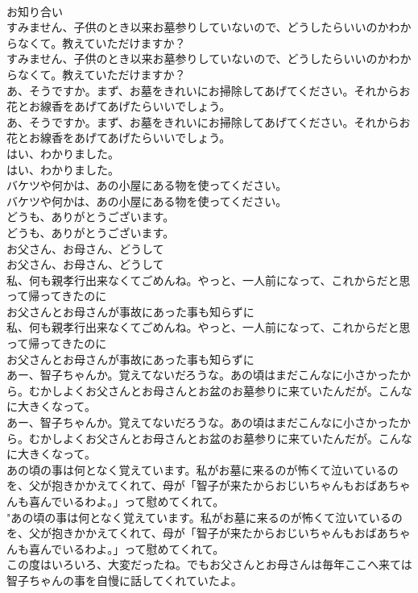 \documentclass[8pt]{extreport}
\begin{document}
\begin{CJK}{UTF8}{min}
\\	お知り合い
\\	すみません、子供のとき以来お墓参りしていないので、どうしたらいいのかわからなくて。教えていただけますか？	
\\	すみません、子供のとき以来お墓参りしていないので、どうしたらいいのかわからなくて。教えていただけますか？ 
\\	あ、そうですか。まず、お墓をきれいにお掃除してあげてください。それからお花とお線香をあげてあげたらいいでしょう。	
\\	あ、そうですか。まず、お墓をきれいにお掃除してあげてください。それからお花とお線香をあげてあげたらいいでしょう。 
\\	はい、わかりました。	
\\	はい、わかりました。 
\\	バケツや何かは、あの小屋にある物を使ってください。	
\\	バケツや何かは、あの小屋にある物を使ってください。 
\\	どうも、ありがとうございます。	
\\	どうも、ありがとうございます。 
\\	お父さん、お母さん、どうして
\\	お父さん、お母さん、どうして
\\	私、何も親孝行出来なくてごめんね。やっと、一人前になって、これからだと思って帰ってきたのに
\\	お父さんとお母さんが事故にあった事も知らずに
\\	私、何も親孝行出来なくてごめんね。やっと、一人前になって、これからだと思って帰ってきたのに
\\	お父さんとお母さんが事故にあった事も知らずに
\\	あー、智子ちゃんか。覚えてないだろうな。あの頃はまだこんなに小さかったから。むかしよくお父さんとお母さんとお盆のお墓参りに来ていたんだが。こんなに大きくなって。	
\\	あー、智子ちゃんか。覚えてないだろうな。あの頃はまだこんなに小さかったから。むかしよくお父さんとお母さんとお盆のお墓参りに来ていたんだが。こんなに大きくなって。 
\\	あの頃の事は何となく覚えています。私がお墓に来るのが怖くて泣いているのを、父が抱きかかえてくれて、母が「智子が来たからおじいちゃんもおばあちゃんも喜んでいるわよ。」って慰めてくれて。	
\\	"あの頃の事は何となく覚えています。私がお墓に来るのが怖くて泣いているのを、父が抱きかかえてくれて、母が「智子が来たからおじいちゃんもおばあちゃんも喜んでいるわよ。」って慰めてくれて。 
\\	この度はいろいろ、大変だったね。でもお父さんとお母さんは毎年ここへ来ては智子ちゃんの事を自慢に話してくれていたよ。	

\end{CJK}
\end{document}
